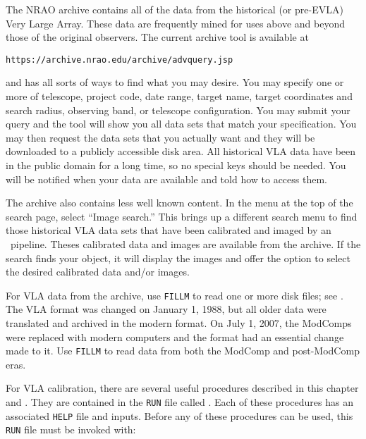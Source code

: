The NRAO archive contains all of the data from the historical (or
pre-EVLA) Very Large Array.  These data are frequently mined for uses
above and beyond those of the original observers.  The current archive
tool is available at\\
\centerline{{\tt https://archive.nrao.edu/archive/advquery.jsp}}
and has all sorts of ways to find what you may desire.  You may
specify one or more of telescope, project code, date range, target
name, target coordinates and search radius, observing band, or
telescope configuration.  You may submit your query and the tool will
show you all data sets that match your specification.  You may then
request the data sets that you actually want and they will be
downloaded to a publicly accessible disk area.  All historical VLA
data have been in the public domain for a long time, so no special
keys should be needed.  You will be notified when your data are
available and told how to access them.

The archive also contains less well known content.  In the menu at the
top of the search page, select ``Image search.''  This brings up a
different search menu to find those historical VLA data sets that have
been calibrated and imaged by an \AIPS\ pipeline.  Theses calibrated
data and images are available from the archive.  If the search finds
your object, it will display the images and offer the option to select
the desired calibrated data and/or images.

For VLA data from the archive, use {\tt FILLM} to read one or more
disk files; see .   The VLA format was changed on
January 1, 1988, but all older data were translated and archived in
the modern format.  On July 1, 2007, the ModComps were replaced with
modern computers and the format had an essential change made to it.
Use {\tt FILLM} to read data from both the ModComp and post-ModComp
eras.

For VLA calibration, there are several useful procedures described in
this chapter and .  They are contained in the {\tt RUN}
file called \hbox{{\tt {}}}.  Each of these procedures
has an associated {\tt HELP} file and inputs.  Before any of these
procedures can be used, this {\tt RUN} file must be invoked with:


